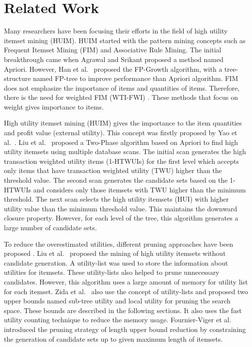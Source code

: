 \documentclass[11pt,openright]{report}
\begin{document}
\section{Related Work}\label{section:relatedwork}
Many researchers have been focusing their efforts in the field of high utility itemset mining (HUIM). HUIM started with the pattern mining concepts \cite{Chen1996, Barber2003, Li2005, Han2000} such as Frequent Itemset Mining (FIM) and Associative Rule Mining. The initial breakthrough came when Agrawal and Srikant \cite{Agrawal1994} proposed a method named Apriori. However, Han et al.~\cite{Han2000} proposed the FP-Growth algorithm, with a tree-structure named FP-tree to improve performance than Apriori algorithm. FIM does not emphasize the importance of items and quantities of items. Therefore, there is the need for weighted FIM (WTI-FWI) \cite{Yun2013, Yun2014}. These methods that focus on weight gives importance to items.

High utility itemset mining (HUIM) \cite{Ahmed2009, Yao2006, Erwin2007, Yen2007, Lin2011, Wu2012, Yao2004, Tseng2013} gives the importance to the item quantities and profit value (external utility). This concept was firstly proposed by Yao et al.~\cite{Yao2004}. Liu et al.~\cite{Liu2005} proposed a Two-Phase algorithm based on Apriori to find high utility itemsets using multiple database scans. The initial scan generates the high transaction weighted utility items (1-HTWUIs) for the first level which accepts only items that have transaction weighted utility (TWU) higher than the threshold value. The second scan generates the candidate sets based on the 1-HTWUIs and considers only those itemsets with TWU higher than the minimum threshold. The next scan selects the high utility itemsets (HUI) with higher utility value than the minimum threshold value. This maintains the downward closure property. However, for each level of the tree, this algorithm generates a large number of candidate sets. 

To reduce the overestimated utilities, different pruning approaches have been proposed \cite{Chu2009, Liu2012, Lan2014, Krishnamoorthy2015, Zida2015, Tseng2013, Fournier-Viger2014, Song2014, Fournier-Viger2016}. Liu et al.~\cite{Liu2012} proposed the mining of high utility itemsets without candidate generation. A utility-list was used to store the information about utilities for itemsets. These utility-lists also helped to prune unnecessary candidates. However, this algorithm uses a large amount of memory for utility list for each itemset. Zida et al.~\cite{Zida2015} also use the concept of utility-lists and proposed two upper bounds named sub-tree utility and local utility for pruning the search space. These bounds are described in the following sections. It also uses the fast utility counting technique to reduce the memory usage. Fournier-Viger et al.~\cite{Fournier-Viger2016} introduced the pruning strategy of length upper bound reduction by constraining the generation of candidate sets up to given maximum length of itemsets.
\end{document}
